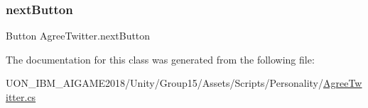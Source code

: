 \subsubsection{\texorpdfstring{nextButton}{nextButton}}
{\footnotesize\ttfamily Button Agree\+Twitter.\+next\+Button}



The documentation for this class was generated from the following file\+:\begin{DoxyCompactItemize}
\item 
U\+O\+N\+\_\+\+I\+B\+M\+\_\+\+A\+I\+G\+A\+M\+E2018/\+Unity/\+Group15/\+Assets/\+Scripts/\+Personality/\mbox{\hyperlink{_agree_twitter_8cs}{Agree\+Twitter.\+cs}}\end{DoxyCompactItemize}
